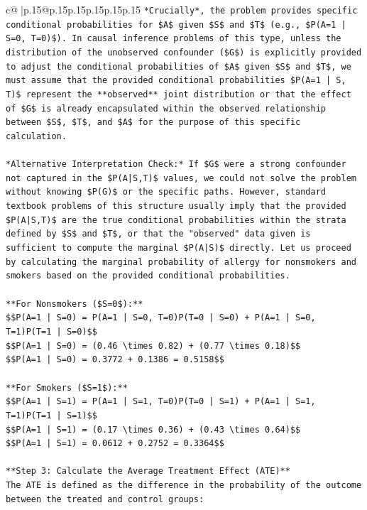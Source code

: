 \documentclass{article}
\begin{document}
{\begin{supertabular}{c@{$\;$}|p{.15\linewidth}@{}p{.15\linewidth}p{.15\linewidth}p{.15\linewidth}p{.15\linewidth}p{.15\linewidth}}
{{{\texttt{*Crucially*, the problem provides specific conditional probabilities for \$A\$ given \$S\$ and \$T\$ (e.g., \$P(A=1 | S=0, T=0)\$). In causal inference problems of this type, unless the distribution of the unobserved confounder (\$G\$) is explicitly provided to adjust the conditional probabilities of \$A\$ given \$S\$ and \$T\$, we must assume that the provided conditional probabilities \$P(A=1 | S, T)\$ represent the **observed** joint distribution or that the effect of \$G\$ is already encapsulated within the observed relationship between \$S\$, \$T\$, and \$A\$ for the purpose of this specific calculation.} \\
\\ 
\texttt{*Alternative Interpretation Check:* If \$G\$ were a strong confounder not captured in the \$P(A|S,T)\$ values, we could not solve the problem without knowing \$P(G)\$ or the specific paths. However, standard textbook problems of this structure usually imply that the provided \$P(A|S,T)\$ are the true conditional probabilities within the strata defined by \$S\$ and \$T\$, or that the "observed" data given is sufficient to compute the marginal \$P(A|S)\$ directly. Let us proceed by calculating the marginal probability of allergy for nonsmokers and smokers based on the provided conditional probabilities.} \\
\\ 
\texttt{**For Nonsmokers (\$S=0\$):**} \\
\texttt{\$\$P(A=1 | S=0) = P(A=1 | S=0, T=0)P(T=0 | S=0) + P(A=1 | S=0, T=1)P(T=1 | S=0)\$\$} \\
\texttt{\$\$P(A=1 | S=0) = (0.46 \textbackslash{}times 0.82) + (0.77 \textbackslash{}times 0.18)\$\$} \\
\texttt{\$\$P(A=1 | S=0) = 0.3772 + 0.1386 = 0.5158\$\$} \\
\\ 
\texttt{**For Smokers (\$S=1\$):**} \\
\texttt{\$\$P(A=1 | S=1) = P(A=1 | S=1, T=0)P(T=0 | S=1) + P(A=1 | S=1, T=1)P(T=1 | S=1)\$\$} \\
\texttt{\$\$P(A=1 | S=1) = (0.17 \textbackslash{}times 0.36) + (0.43 \textbackslash{}times 0.64)\$\$} \\
\texttt{\$\$P(A=1 | S=1) = 0.0612 + 0.2752 = 0.3364\$\$} \\
\\ 
\texttt{**Step 3: Calculate the Average Treatment Effect (ATE)**} \\
\texttt{The ATE is defined as the difference in the probability of the outcome between the treated and control groups:} \\
}}}
\end{supertabular}}
\end{document}
